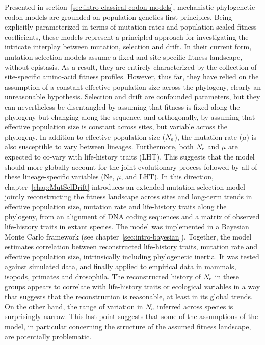 Presented in section~\ref{sec:intro-classical-codon-models}, mechanistic phylogenetic codon models are grounded on population genetics first principles.
Being explicitly parameterized in terms of mutation rates and population-scaled fitness coefficients, these models represent a principled approach for investigating the intricate interplay between mutation, selection and drift.
In their current form, mutation-selection models assume a fixed and site-specific fitness landscape, without epistasis.
As a result, they are entirely characterized by the collection of site-specific amino-acid fitness profiles.
However, thus far, they have relied on the assumption of a constant effective population size across the phylogeny, clearly an unreasonable hypothesis.
Selection and drift are confounded parameters, but they can nevertheless be disentangled by assuming that fitness is fixed along the phylogeny but changing along the sequence, and orthogonally, by assuming that effective population size is constant across sites, but variable across the phylogeny.
In addition to effective population size ($N_{\textrm{e}}$), the mutation rate ($\mu$) is also susceptible to vary between lineages.
Furthermore, both $N_{\textrm{e}}$ and $\mu$ are expected to co-vary with life-history traits (\acrshort{LHT}).
This suggests that the model should more globally account for the joint evolutionary process followed by all of these lineage-specific variables (Ne, $\mu$, and LHT).
In this direction, chapter~\ref{chap:MutSelDrift} introduces an extended mutation-selection model jointly reconstructing the fitness landscape across sites and long-term trends in effective population size, mutation rate and life-history traits along the phylogeny, from an alignment of \acrshort{DNA} coding sequences and a matrix of observed life-history traits in extant species.
The model was implemented in a Bayesian Monte Carlo framework (see chapter~\ref{sec:intro-bayesian}).
Together, the model estimates correlation between reconstructed life-history traits, mutation rate and effective population size, intrinsically including phylogenetic inertia.
It was tested against simulated data, and finally applied to empirical data in mammals, isopods, primates and drosophila.
The reconstructed history of $N_{\textrm{e}}$ in these groups appears to correlate with life-history traits or ecological variables in a way that suggests that the reconstruction is reasonable, at least in its global trends.
On the other hand, the range of variation in $N_{\textrm{e}}$ inferred across species is surprisingly narrow.
This last point suggests that some of the assumptions of the model, in particular concerning the structure of the assumed fitness landscape, are potentially problematic.

